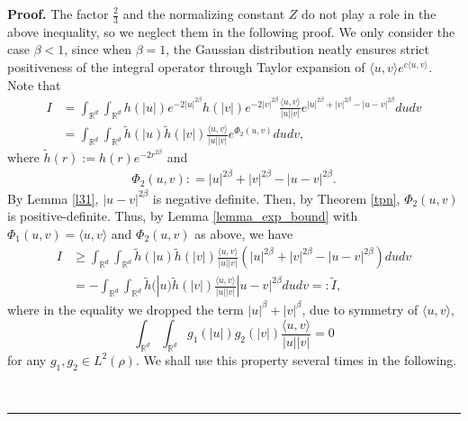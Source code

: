 \documentclass[]{elsarticle}
\def\R{\mathbb{R}}
\newcommand{\inp}[1]{\langle{#1}\rangle}
\newenvironment{proof}[1][Proof]{\noindent\textbf{#1.} }{\ \rule{0.5em}{0.5em}}
\numberwithin{equation}{section}
\numberwithin{theorem}{section}
\newcommand\RR{{\mathbb R}}
\begin{document}
 \begin{proof} The factor $\frac{2}{3}$ and the normalizing constant $Z$ do not play a role in the above inequality, so we neglect them in the following proof. We only consider the case $\beta<1$, since when $\beta=1$,  the Gaussian distribution neatly ensures strict positiveness of the integral operator through Taylor expansion of $\inp{u,v}e^{c\inp{u,v}}$. Note that 
 \begin{align*}
I &=\int_{\R^d}\int_{\R^d}h(|u|)e^{-2|u|^{2\beta}}h(|v|)e^{-2|v|^{2\beta}}\frac{\langle u,v \rangle}{|u||v|}e^{|u|^{2\beta}+ |v|^{2\beta}-|u-v|^{2\beta}}dudv\\
&= \int_{\R^d}\int_{\R^d} \widetilde h(|u)\widetilde h(|v|)\frac{\langle u,v \rangle}{|u||v|}e^{\Phi_2(u,v)}dudv,
 \end{align*} 
 where $\widetilde h(r) :=h(r)e^{-2r^{2\beta}}$ and 
\begin{eqnarray*}
\Phi_2(u,v) : =|u|^{2\beta}+|v|^{2\beta}-|u-v|^{2\beta}.
\end{eqnarray*}
By Lemma \ref{l31}, $|u-v|^{2\beta}$ is negative definite. Then, by Theorem \ref{tpn}, $\Phi_2(u,v)$ is positive-definite. Thus, by Lemma \ref{lemma_exp_bound} with $\Phi_1(u,v) = \inp {u,v}$ and $\Phi_2(u,v)$ as above, we have
\begin{align}
I &\geq \int_{\RR^d}\int_{\RR^d}\widetilde h(|u)\widetilde h(|v|)\frac{\langle u,v \rangle}{|u||v|}\left(|u|^{2\beta}+|v|^{2\beta}-|u-v|^{2\beta}\right)dudv
\nonumber \\
&=-\int_{\RR^d}\int_{\RR^d}\widetilde h(|u)\widetilde h(|v|)\frac{\langle u,v \rangle}{|u||v|}|u-v|^{2\beta}dudv =:\widetilde I  , \label{eq:|u-v|2beta}
\end{align}
where in the equality we dropped the term $|u|^\beta+|v|^\beta$, due to symmetry of $\langle u,v \rangle$,
\[\int_{\R^d}\int_{\R^d}g_1(|u|)g_2(|v|)\frac{\langle u,v \rangle}{|u||v|} =0 \] for any $g_1,g_2\in L^2(\rho)$. We shall use this property several times in the following. 



\end{proof}
\end{document}
